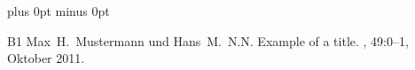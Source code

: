 \documentclass[a4paper,11pt]{article}
\begin{document}
\vspace{3mm}
\begin{multicols}{2}
\noindent






%
%
%



\begin{thebibliography}{1}
\itemsep=0cm plus 0pt minus 0pt


\bibitem
{B1}
Max~H.\ Mustermann und Hans~M.\ N.N.
\newblock Example of a title.
, 49:0--1, Oktober 2011.



\end{thebibliography}


\end{multicols}



\end{document}
